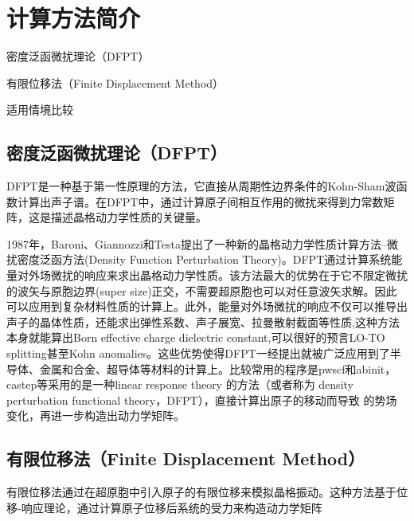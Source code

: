 \section{计算方法简介}\label{sec:计算方法简介}


\begin{Abstract}
    \item 密度泛函微扰理论（DFPT）
    \item 有限位移法（Finite Displacement Method）
    \item 适用情境比较
\end{Abstract}


\subsection{密度泛函微扰理论（DFPT）}\label{sec:计算方法简介-密度泛函微扰理论（DFPT）}

DFPT是一种基于第一性原理的方法，它直接从周期性边界条件的Kohn-Sham波函数计算出声子谱。在DFPT中，通过计算原子间相互作用的微扰来得到力常数矩阵，这是描述晶格动力学性质的关键量。

\begin{extend}
    1987年，Baroni、Giannozzi和Testa提出了一种新的晶格动力学性质计算方法--微扰密度泛函方法(Density Function Perturbation Theory)。DFPT通过计算系统能量对外场微扰的响应来求出晶格动力学性质。该方法最大的优势在于它不限定微扰的波矢与原胞边界(super size)正交，不需要超原胞也可以对任意波矢求解。因此可以应用到复杂材料性质的计算上。此外，能量对外场微扰的响应不仅可以推导出声子的晶体性质，还能求出弹性系数、声子展宽、拉曼散射截面等性质,这种方法本身就能算出Born effective charge dielectric constant,可以很好的预言LO-TO splitting甚至Kohn anomalies。这些优势使得DFPT一经提出就被广泛应用到了半导体、金属和合金、超导体等材料的计算上。比较常用的程序是pwscf和abinit，castep等采用的是一种linear response theory 的方法（或者称为  density perturbation functional theory，DFPT），直接计算出原子的移动而导致  的势场变化，再进一步构造出动力学矩阵。
\end{extend}

\subsection{有限位移法（Finite Displacement Method）}\label{sec:计算方法简介-有限位移法（Finite Displacement Method）}

有限位移法通过在超原胞中引入原子的有限位移来模拟晶格振动。这种方法基于位移-响应理论，通过计算原子位移后系统的受力来构造动力学矩阵

